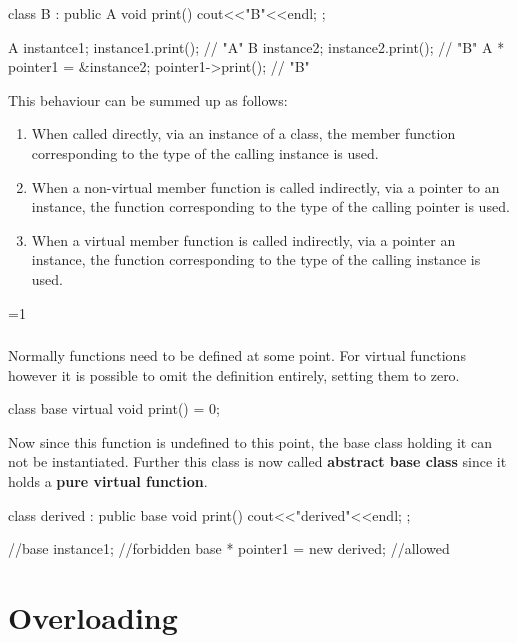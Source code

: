 \documentclass[10pt,a4paper]{scrartcl}
\gdef\conditionmacro{0}
\begin{document}
\begin{multicols*}{2}
\begin{TPCpp}
class B : public A {
	void print()
	{cout<<"B"<<endl;}
};

A instantce1;
instance1.print(); // "A"
B instance2;
instance2.print(); // "B"
A * pointer1 = &instance2;
pointer1->print(); // "B"
\end{TPCpp}

This behaviour can be summed up as follows:

\begin{enumerate}
\item When called directly, via an instance of a class, the member function corresponding to the type of the calling instance is used.
\item When a non-virtual member function is called indirectly, via a pointer to an instance, the function corresponding to the type of the calling pointer is used.
\item When a virtual member function is called indirectly, via a pointer an instance, the function corresponding to the type of the calling instance is used.
\end{enumerate}

\ifnum\conditionmacro=1
\subsubsection{}
\label{sec:AbstractBaseClass}

Normally functions need to be defined at some point. For virtual functions however it is possible to omit the definition entirely, setting them to zero.

\begin{TPCpp}
class base  {
	virtual void print() = 0;
}
\end{TPCpp}

Now since this function is undefined to this point, the base class holding it can not be instantiated. Further this class is now called \textbf{abstract base class} since it holds a \textbf{pure virtual function}.

\begin{TPCpp}
class derived : public base {
	void print() {
		cout<<"derived"<<endl;
	}
};

//base instance1; //forbidden
base * pointer1 = new derived; //allowed
\end{TPCpp}
\fi

\section{Overloading}
\label{sec:Overloading}


\end{multicols*}
\end{document}

